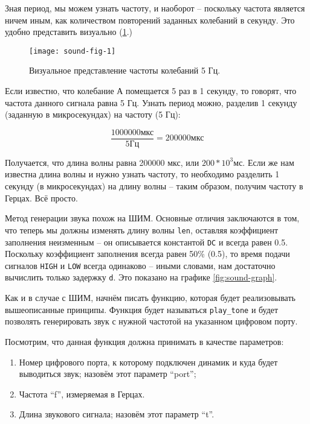 \documentclass[../sparc.tex]{subfiles}
\begin{document}
Зная период, мы можем узнать частоту, и наоборот -- поскольку частота является
ничем иным, как количеством повторений заданных колебаний в секунду. Это удобно
представить визуально (\ref{fig:sound-fig-1}.)

\begin{figure}[h]
  \centering
  \texttt{[image: sound-fig-1]}
  \caption{Визуальное представление частоты колебаний 5 Гц.}
  \label{fig:sound-fig-1}
\end{figure}

Если известно, что колебание А помещается 5 раз в 1 секунду, то говорят, что
частота данного сигнала равна 5 Гц. Узнать период можно, разделив 1 секунду
(заданную в микросекундах) на частоту (5 Гц):

\begin{equation}
  \frac{1000000 \mbox{мкс}}{5 \mbox{Гц}} = 200000 \mbox{мкс}
\end{equation}

Получается, что длина волны равна 200000 мкс, или $ 200 * 10^3 \mbox{мс} $. Если
же нам известна длина волны и нужно узнать частоту, то необходимо разделить 1
секунду (в микросекундах) на длину волны -- таким образом, получим частоту в
Герцах. Всё просто.


Метод генерации звука похож на \gls{ШИМ}.  Основные отличия заключаются в том,
что теперь мы должны изменять длину волны \texttt{len}, оставляя коэффициент
заполнения неизменным -- он описывается константой \texttt{DC} и всегда равен
0.5.  Поскольку коэффициент заполнения всегда равен 50\% (0.5), то время подачи
сигналов \texttt{HIGH} и \texttt{LOW} всегда одинаково -- иными словами, нам
достаточно вычислить только задержку \texttt{d}.  Это показано на графике
\ref{fig:sound-graph}.

Как и в случае с ШИМ, начнём писать функцию, которая будет реализовывать
вышеописанные принципы. Функция будет называться \texttt{play\_tone} и будет
позволять генерировать звук с нужной частотой на указанном цифровом порту.

Посмотрим, что данная функция должна принимать в качестве параметров:
\begin{enumerate}
\item Номер цифрового порта, к которому подключен динамик и куда будет
  выводиться звук; назовём этот параметр ``port'';
\item Частота ``f'', измеряемая в Герцах.
\item Длина звукового сигнала; назовём этот параметр ``t''.
\end{enumerate}
\end{document}
